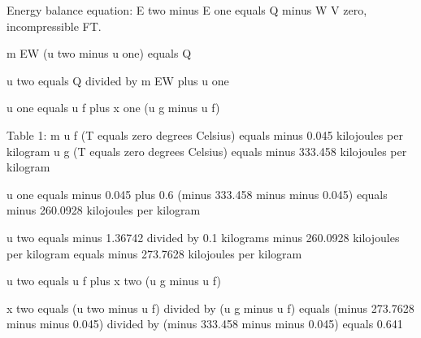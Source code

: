 Energy balance equation:  
E two minus E one equals Q minus W V zero, incompressible FT.  

m EW (u two minus u one) equals Q  

u two equals Q divided by m EW plus u one  

u one equals u f plus x one (u g minus u f)  

Table 1:  
m u f (T equals zero degrees Celsius) equals minus 0.045 kilojoules per kilogram  
u g (T equals zero degrees Celsius) equals minus 333.458 kilojoules per kilogram  

u one equals minus 0.045 plus 0.6 (minus 333.458 minus minus 0.045)  
equals minus 260.0928 kilojoules per kilogram  

u two equals minus 1.36742 divided by 0.1 kilograms minus 260.0928 kilojoules per kilogram  
equals minus 273.7628 kilojoules per kilogram  

u two equals u f plus x two (u g minus u f)  

x two equals (u two minus u f) divided by (u g minus u f)  
equals (minus 273.7628 minus minus 0.045) divided by (minus 333.458 minus minus 0.045)  
equals 0.641